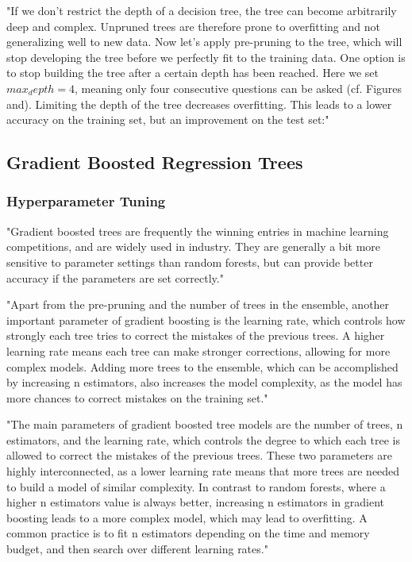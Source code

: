 "If we don’t restrict the depth of a decision tree, the tree
can become arbitrarily deep and complex. Unpruned trees are therefore
prone to overfitting and not generalizing well to new data. Now let’s
apply pre-pruning to the tree, which will stop developing the tree
before we perfectly fit to the training data. One option is to
stop building the tree after a certain depth has been reached. Here we
set $max_depth=4$, meaning only four consecutive questions can be asked
(cf. Figures  and). Limiting the depth of the tree decreases overfitting. This leads to a
lower accuracy on the training set, but an improvement on the test set:" \cite[p. 133-136]{muller_introduction_2016}



\subsection{Gradient Boosted Regression Trees} 

\subsubsection*{Hyperparameter Tuning}

"Gradient boosted trees are frequently the winning entries in machine
learning competitions, and are widely used in industry. They are
generally a bit more sensitive to parameter settings than random
forests, but can provide better accuracy if the parameters are set
correctly." \cite[p. 88-89]{muller_introductionmachinelearning_2016}

"Apart from the pre-pruning and the number of trees in the ensemble,
another important parameter of gradient boosting is the learning rate,
which controls how strongly each tree tries to correct the mistakes of
the previous trees. A higher learning rate means each tree can make
stronger corrections, allowing for more complex models. Adding more trees to the ensemble, which can be accomplished by increasing
n estimators, also increases the model complexity, as the model has
more chances to correct mistakes on the training set." \cite[p. 88-89]{muller_introductionmachinelearning_2016}

"The main parameters of gradient boosted tree models are the number
of trees, n estimators, and the learning rate, which controls the degree to which each tree is allowed to correct the mistakes of the previous trees.
These two parameters are highly interconnected, as a lower
learning rate means that more trees are needed to build a model of
similar complexity. In contrast to random forests, where a higher
n estimators value is always better, increasing n estimators in gradient
boosting leads to a more complex model, which may lead to overfitting. A
common practice is to fit n estimators depending on the time and
memory budget, and then search over different learning rates." \cite[p. 88-89]{muller_introductionmachinelearning_2016}


